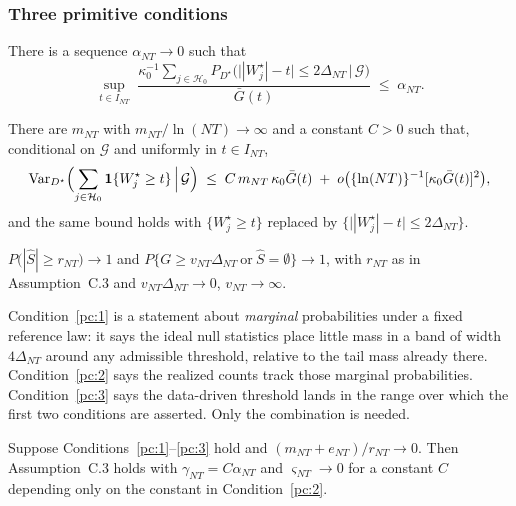 \subsubsection*{Three primitive conditions}

\begin{condition}
\label{pc:1}
There is a sequence $\alpha_{NT} \to 0$ such that
\[
\sup_{t \in I_{NT}}\;
\frac{\kappa_0^{-1}\sum_{j \in \mathcal{H}_0}
      P_{D^\star}\bigl( \bigl||W_j^\star| - t\bigr| \le 2\Delta_{NT}
                        \,\big|\, \mathcal{G}\bigr)}
     {\bar G(t)}
\;\le\; \alpha_{NT}.
\]
\end{condition}

\begin{condition}
\label{pc:2}
There are $m_{NT}$ with $m_{NT}/\ln(NT) \to \infty$ and a constant $C>0$ such
that, conditional on $\mathcal{G}$ and uniformly in $t \in I_{NT}$,
\[
\operatorname{Var}_{D^\star}\Bigl( \sum_{j \in \mathcal{H}_0}
     \mathbf 1\{ W_j^\star \ge t \} \,\Big|\, \mathcal{G} \Bigr)
\;\le\; C\, m_{NT}\, \kappa_0 \bar G(t)
   \;+\; o\bigl( \{\ln (NT)\}^{-1} [\kappa_0 \bar G(t)]^2 \bigr),
\]
and the same bound holds with $\{W_j^\star \ge t\}$ replaced by
$\{ \bigl||W_j^\star|-t\bigr| \le 2\Delta_{NT}\}$.
\end{condition}

\begin{condition}
\label{pc:3}
$P\bigl( |\widehat S| \ge r_{NT} \bigr) \to 1$ and
$P\bigl\{ G \ge v_{NT}\Delta_{NT} \ \text{or}\ \widehat S = \emptyset \bigr\} \to 1$,
with $r_{NT}$ as in Assumption~C.3 and $v_{NT}\Delta_{NT} \to 0$,
$v_{NT} \to \infty$.
\end{condition}

Condition~\ref{pc:1} is a statement about \emph{marginal} probabilities under a
fixed reference law: it says the ideal null statistics place little mass in a
band of width $4\Delta_{NT}$ around any admissible threshold, relative to the
tail mass already there.  Condition~\ref{pc:2} says the realized counts track
those marginal probabilities.  Condition~\ref{pc:3} says the data-driven
threshold lands in the range over which the first two conditions are asserted.
Only the combination is needed.

\begin{proposition}
\label{prop:threshold}
Suppose Conditions~\ref{pc:1}--\ref{pc:3} hold and
$(m_{NT} + e_{NT})/r_{NT} \to 0$.  Then Assumption~C.3 holds with
$\gamma_{NT} = C\alpha_{NT}$ and $\varsigma_{NT} \to 0$ for a constant $C$
depending only on the constant in Condition~\ref{pc:2}.
\end{proposition}

